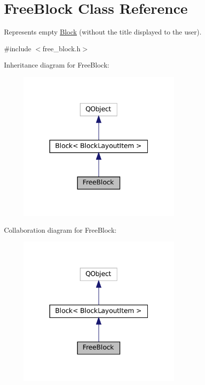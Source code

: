 \hypertarget{class_free_block}{}\section{Free\+Block Class Reference}
\label{class_free_block}


Represents empty \mbox{\hyperlink{class_block}{Block}} (without the title displayed to the user).  




{\ttfamily \#include $<$free\+\_\+block.\+h$>$}



Inheritance diagram for Free\+Block\+:
\nopagebreak
\begin{figure}[H]
\begin{center}
\leavevmode
\includegraphics[width=229pt]{class_free_block__inherit__graph}
\end{center}
\end{figure}


Collaboration diagram for Free\+Block\+:
\nopagebreak
\begin{figure}[H]
\begin{center}
\leavevmode
\includegraphics[width=229pt]{class_free_block__coll__graph}
\end{center}
\end{figure}

